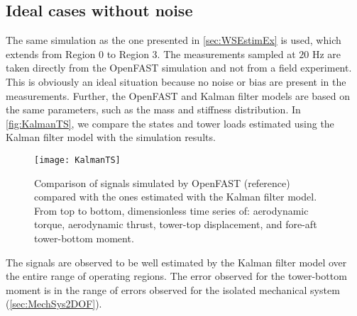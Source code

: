 \documentclass[wes, manuscript]{copernicus}
\begin{document}
\subsection{Ideal cases without noise}
\label{sec:canonical}
% 
The same simulation as the one presented in \autoref{sec:WSEstimEx} is used, which extends from Region 0 to Region 3. The measurements sampled at $20$ \unit{Hz} are taken directly from the OpenFAST simulation and not from a field experiment. This is obviously an ideal situation because no noise or bias are present in the measurements. Further, the OpenFAST and Kalman filter models are based on the same parameters, such as the mass and stiffness distribution. 
%
%
In \autoref{fig:KalmanTS}, we compare the states and tower loads estimated using the Kalman filter model with the simulation results.
%
\noindent\begin{figure}[!htb]\centering%
  \hfill\texttt{[image: KalmanTS]}\hfill
  \caption{Comparison of signals simulated by OpenFAST (reference) compared with the ones estimated with the Kalman filter model. From top to bottom, dimensionless time series of: aerodynamic torque, aerodynamic thrust, tower-top displacement, and fore-aft tower-bottom moment. }\label{fig:KalmanTS}%
\end{figure}
%
The signals are observed to be well estimated by the Kalman filter model over the entire range of operating regions.
The error observed for the tower-bottom moment is in the range of errors observed for the isolated mechanical system (\autoref{sec:MechSys2DOF}).
\end{document}

